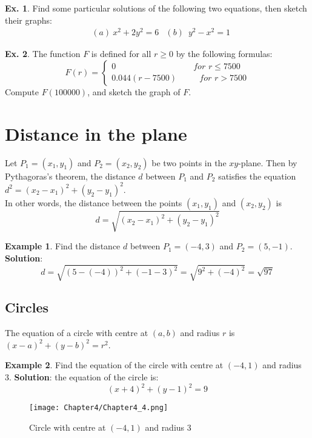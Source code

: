 \documentclass[10pt,a4paper]{book}
\theoremstyle{definition}\newtheorem{definition}{Definition}
\theoremstyle{definition}\newtheorem{fact}{Fact}
\theoremstyle{definition}\newtheorem{ex}{Ex.}
\theoremstyle{definition}\newtheorem{project}{Project}
\theoremstyle{definition}\newtheorem{problem}{Problem}
\theoremstyle{definition}\newtheorem{example}{Example}
\numberwithin{theorem}{chapter}
\numberwithin{corollary}{chapter}
\numberwithin{assumption}{chapter}
\numberwithin{definition}{chapter}
\numberwithin{prop}{chapter}
\numberwithin{notation}{chapter}
\numberwithin{problem}{chapter}
\numberwithin{example}{chapter}
\numberwithin{fact}{chapter}
\numberwithin{ex}{chapter}
\begin{document}
	\begin{ex}
		Find some particular solutions of the following two equations, then sketch their graphs:
		\begin{align*}
			& (a) \ x^2+2y^2=6 & (b) \,\,\,y^2-x^2=1 
		\end{align*}
	\end{ex}
	
	\begin{ex}
		The function $F$ is defined for all $r \geq 0$ by the following formulas:
		$$
		F(r)=
		\begin{cases}
			0 \,\,\,\,\,\,\,\,\,\,\,\,\,\,\,\,\,\,\,\,\,\,\,\,\,\,\,\,\,\,\,\,\,\,\,\,\,\,\,\,\,\,\,\,\,\,\,\,\,\,\,\,\,\,\, for \,\, r \leq7500 \\
			0.044(r-7500) \,\,\,\,\,\,\,\,\,\,\,\,\,\,\,\, for \,\, r>7500                                                                       
		\end{cases}
		$$
		Compute $F(100000)$, and sketch the graph of $F$.
	\end{ex}
	\pagebreak
	
	\section{Distance in the plane}
	Let $P_1 = (x_1, y_1)$ and $P_2 = (x_2, y_2)$ be two points in the $xy$-plane. Then by Pythagoras’s theorem, the distance $d$ between $P_1$ and $P_2$ satisfies the equation $d^2 = (x_2 - x_1)^2 + (y_2 - y_1)^2$.
	\\
	In other words, the distance between the points $(x_1, y_1)$ and $(x_2, y_2)$ is
	$$ d = \sqrt{(x_2 - x_1)^2 + (y_2 - y_1)^2} $$
	
	\begin{example}
		Find the distance $d$ between $P_1 = (-4,3)$ and $P_2 = (5,-1)$.
		\textbf{Solution}:
		$$d=\sqrt{(5-(-4))^2 + (-1-3)^2}=\sqrt{9^2+(-4)^2}=\sqrt{97}$$
	\end{example}
	
	\subsection{Circles}
	The equation of a circle with centre at $(a, b)$ and radius $r$ is $(x-a)^2 +(y-b)^2 = r^2$.
	
	\begin{example}
		Find the equation of the circle with centre at $(-4, 1)$ and radius 3.
		\textbf{Solution}: the equation of the circle is:
		$$ (x+4)^2 +(y-1)^2 = 9 $$
		\begin{figure}[ht]
			\centering
			\texttt{[image: Chapter4/Chapter4\_4.png]}
			\caption{Circle with centre at $(-4, 1)$ and radius 3}
		\end{figure}
	\end{example}
	
\end{document}
